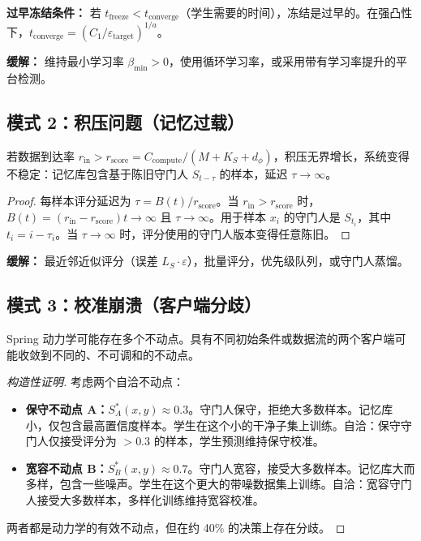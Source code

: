 \textbf{过早冻结条件：} 若 $t_{\text{freeze}} < t_{\text{converge}}$（学生需要的时间），冻结是过早的。在强凸性下，$t_{\text{converge}} = (C_1/\varepsilon_{\text{target}})^{1/a}$。

\textbf{缓解：} 维持最小学习率 $\beta_{\min} > 0$，使用循环学习率，或采用带有学习率提升的平台检测。

\subsection{模式 2：积压问题（记忆过载）}

\begin{theorem}[积压不稳定性]\label{thm:backlog}
若数据到达率 $r_{\text{in}} > r_{\text{score}} = C_{\text{compute}} / (M + K_S + d_\phi)$，积压无界增长，系统变得不稳定：记忆库包含基于陈旧守门人 $S_{t-\tau}$ 的样本，延迟 $\tau \to \infty$。
\end{theorem}

\begin{proof}
每样本评分延迟为 $\tau = B(t)/r_{\text{score}}$。当 $r_{\text{in}} > r_{\text{score}}$ 时，$B(t) = (r_{\text{in}} - r_{\text{score}})t \to \infty$ 且 $\tau \to \infty$。用于样本 $x_i$ 的守门人是 $S_{t_i}$，其中 $t_i = i - \tau_i$。当 $\tau \to \infty$ 时，评分使用的守门人版本变得任意陈旧。
\end{proof}

\textbf{缓解：} 最近邻近似评分（误差 $L_S \cdot \varepsilon$），批量评分，优先级队列，或守门人蒸馏。

\subsection{模式 3：校准崩溃（客户端分歧）}

\begin{theorem}[多个不动点]\label{thm:multi-fp}
Spring 动力学可能存在多个不动点。具有不同初始条件或数据流的两个客户端可能收敛到不同的、不可调和的不动点。
\end{theorem}

\begin{proof}[构造性证明]
考虑两个自洽不动点：
\begin{itemize}[nosep]
    \item \textbf{保守不动点 A：}$S_A^*(x,y) \approx 0.3$。守门人保守，拒绝大多数样本。记忆库小，仅包含最高置信度样本。学生在这个小的干净子集上训练。自洽：保守守门人仅接受评分为 $> 0.3$ 的样本，学生预测维持保守校准。
    \item \textbf{宽容不动点 B：}$S_B^*(x,y) \approx 0.7$。守门人宽容，接受大多数样本。记忆库大而多样，包含一些噪声。学生在这个更大的带噪数据集上训练。自洽：宽容守门人接受大多数样本，多样化训练维持宽容校准。
\end{itemize}
两者都是动力学的有效不动点，但在约 40\% 的决策上存在分歧。
\end{proof}

